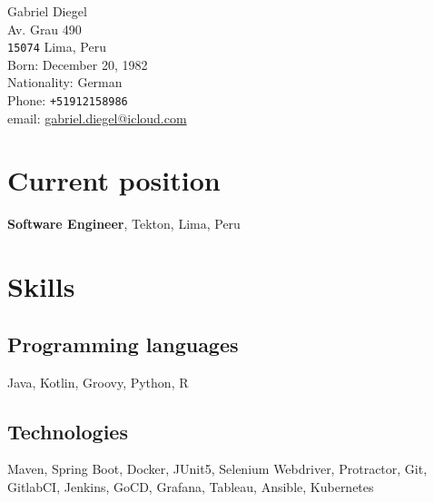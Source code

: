 \documentclass[10pt, a4paper]{article}
\begin{document}
{\LARGE Gabriel Diegel}\\[1cm]
Av. Grau 490\\
\texttt{15074} Lima, Peru\\[.2cm]
Born: December 20, 1982\\
Nationality: German\\[.2cm]
Phone: \texttt{+51912158986}\\
email: \href{mailto:gabriel.diegel@icloud.com}{gabriel.diegel@icloud.com}\\

\section*{Current position}
{\bf Software Engineer}, Tekton, Lima, Peru

\section*{Skills}
\subsection*{Programming languages}
Java, Kotlin, Groovy, Python, R
\subsection*{Technologies}
Maven, Spring Boot, Docker, JUnit5, Selenium Webdriver, Protractor, Git, GitlabCI, Jenkins, GoCD, Grafana, Tableau, Ansible, Kubernetes

\end{document}
